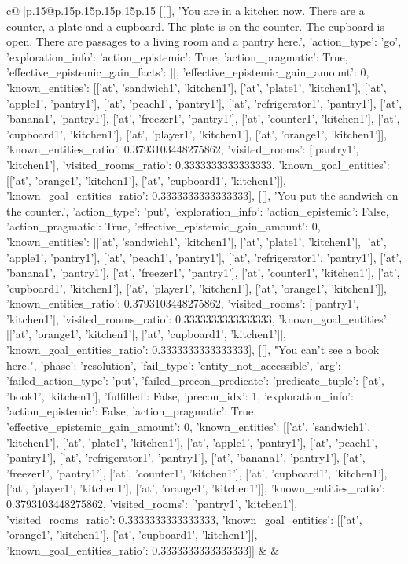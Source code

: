 \documentclass{article}
\begin{document}
{\begin{supertabular}{c@{$\;$}|p{.15\linewidth}@{}p{.15\linewidth}p{.15\linewidth}p{.15\linewidth}p{.15\linewidth}p{.15\linewidth}}
{{{	 [[[], 'You are in a kitchen now. There are a counter, a plate and a cupboard. The plate is on the counter. The cupboard is open. There are passages to a living room and a pantry here.', {'action_type': 'go', 'exploration_info': {'action_epistemic': True, 'action_pragmatic': True, 'effective_epistemic_gain_facts': [], 'effective_epistemic_gain_amount': 0, 'known_entities': [['at', 'sandwich1', 'kitchen1'], ['at', 'plate1', 'kitchen1'], ['at', 'apple1', 'pantry1'], ['at', 'peach1', 'pantry1'], ['at', 'refrigerator1', 'pantry1'], ['at', 'banana1', 'pantry1'], ['at', 'freezer1', 'pantry1'], ['at', 'counter1', 'kitchen1'], ['at', 'cupboard1', 'kitchen1'], ['at', 'player1', 'kitchen1'], ['at', 'orange1', 'kitchen1']], 'known_entities_ratio': 0.3793103448275862, 'visited_rooms': ['pantry1', 'kitchen1'], 'visited_rooms_ratio': 0.3333333333333333, 'known_goal_entities': [['at', 'orange1', 'kitchen1'], ['at', 'cupboard1', 'kitchen1']], 'known_goal_entities_ratio': 0.3333333333333333}}], [[], 'You put the sandwich on the counter.', {'action_type': 'put', 'exploration_info': {'action_epistemic': False, 'action_pragmatic': True, 'effective_epistemic_gain_amount': 0, 'known_entities': [['at', 'sandwich1', 'kitchen1'], ['at', 'plate1', 'kitchen1'], ['at', 'apple1', 'pantry1'], ['at', 'peach1', 'pantry1'], ['at', 'refrigerator1', 'pantry1'], ['at', 'banana1', 'pantry1'], ['at', 'freezer1', 'pantry1'], ['at', 'counter1', 'kitchen1'], ['at', 'cupboard1', 'kitchen1'], ['at', 'player1', 'kitchen1'], ['at', 'orange1', 'kitchen1']], 'known_entities_ratio': 0.3793103448275862, 'visited_rooms': ['pantry1', 'kitchen1'], 'visited_rooms_ratio': 0.3333333333333333, 'known_goal_entities': [['at', 'orange1', 'kitchen1'], ['at', 'cupboard1', 'kitchen1']], 'known_goal_entities_ratio': 0.3333333333333333}}], [[], "You can't see a book here.", {'phase': 'resolution', 'fail_type': 'entity_not_accessible', 'arg': {'failed_action_type': 'put', 'failed_precon_predicate': {'predicate_tuple': ['at', 'book1', 'kitchen1'], 'fulfilled': False, 'precon_idx': 1}}, 'exploration_info': {'action_epistemic': False, 'action_pragmatic': True, 'effective_epistemic_gain_amount': 0, 'known_entities': [['at', 'sandwich1', 'kitchen1'], ['at', 'plate1', 'kitchen1'], ['at', 'apple1', 'pantry1'], ['at', 'peach1', 'pantry1'], ['at', 'refrigerator1', 'pantry1'], ['at', 'banana1', 'pantry1'], ['at', 'freezer1', 'pantry1'], ['at', 'counter1', 'kitchen1'], ['at', 'cupboard1', 'kitchen1'], ['at', 'player1', 'kitchen1'], ['at', 'orange1', 'kitchen1']], 'known_entities_ratio': 0.3793103448275862, 'visited_rooms': ['pantry1', 'kitchen1'], 'visited_rooms_ratio': 0.3333333333333333, 'known_goal_entities': [['at', 'orange1', 'kitchen1'], ['at', 'cupboard1', 'kitchen1']], 'known_goal_entities_ratio': 0.3333333333333333}}]] 
	  } 
	   } 
	   } 
	 & & \\ 
 


\end{supertabular}}
\end{document}
